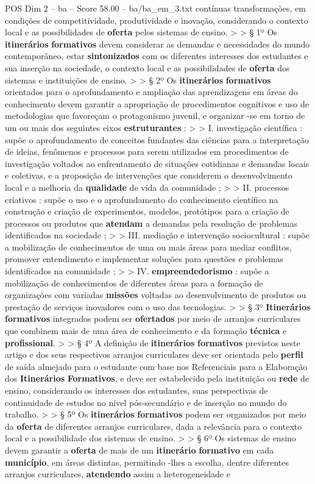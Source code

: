 \begin{textsample}{POS Dim 2 – ba – Score 58.00 – ba/ba\_em\_3.txt}
contínuas transformações, em condições de competitividade, produtividade e inovação, considerando o contexto local e as possibilidades de \textbf{oferta} pelos sistemas de ensino. > > § 1º Os \textbf{itinerários} \textbf{formativos} devem considerar as demandas e necessidades do mundo contemporâneo, estar \textbf{sintonizados} com os diferentes interesses dos estudantes e sua inserção na sociedade, o contexto local e as possibilidades de \textbf{oferta} dos sistemas e instituições de ensino. > > § 2º Os \textbf{itinerários} \textbf{formativos} orientados para o aprofundamento e ampliação das aprendizagens em áreas do conhecimento devem garantir a apropriação de procedimentos cognitivos e uso de metodologias que favoreçam o protagonismo juvenil, e organizar -se em torno de um ou mais dos seguintes eixos \textbf{estruturantes} : > > I. investigação científica : supõe o aprofundamento de conceitos fundantes das ciências para a interpretação de ideias, fenômenos e processos para serem utilizados em procedimentos de investigação voltados ao enfrentamento de situações cotidianas e demandas locais e coletivas, e a proposição de intervenções que considerem o desenvolvimento local e a melhoria da \textbf{qualidade} de vida da comunidade ; > > II. processos criativos : supõe o uso e o aprofundamento do conhecimento científico na construção e criação de experimentos, modelos, protótipos para a criação de processos ou produtos que \textbf{atendam} a demandas pela resolução de problemas identificados na sociedade ; > > III. mediação e intervenção sociocultural : supõe a mobilização de conhecimentos de uma ou mais áreas para mediar conflitos, promover entendimento e implementar soluções para questões e problemas identificados na comunidade ; > > IV. \textbf{empreendedorismo} : supõe a mobilização de conhecimentos de diferentes áreas para a formação de organizações com variadas \textbf{missões} voltadas ao desenvolvimento de produtos ou prestação de serviços inovadores com o uso das tecnologias. > > § 3º \textbf{Itinerários} \textbf{formativos} integrados podem ser \textbf{ofertados} por meio de arranjos curriculares que combinem mais de uma área de conhecimento e da formação \textbf{técnica} e \textbf{profissional}. > > § 4º A definição de \textbf{itinerários} \textbf{formativos} previstos neste artigo e dos seus respectivos arranjos curriculares deve ser orientada pelo \textbf{perfil} de saída almejado para o estudante com base nos Referenciais para a Elaboração dos \textbf{Itinerários} \textbf{Formativos}, e deve ser estabelecido pela instituição ou \textbf{rede} de ensino, considerando os interesses dos estudantes, suas perspectivas de continuidade de estudos no nível pós-secundário e de inserção no mundo do trabalho. > > § 5º Os \textbf{itinerários} \textbf{formativos} podem ser organizados por meio da \textbf{oferta} de diferentes arranjos curriculares, dada a relevância para o contexto local e a possibilidade dos sistemas de ensino. > > § 6º Os sistemas de ensino devem garantir a \textbf{oferta} de mais de um \textbf{itinerário} \textbf{formativo} em cada \textbf{município}, em áreas distintas, permitindo -lhes a escolha, dentre diferentes arranjos curriculares, \textbf{atendendo} assim a heterogeneidade e 
\end{textsample}
